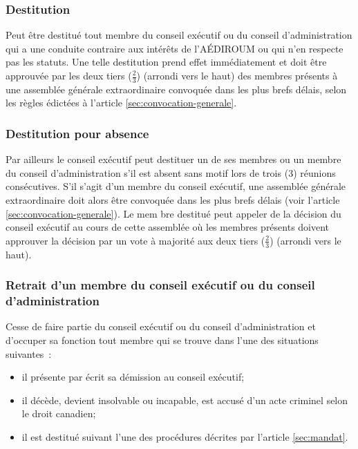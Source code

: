 \documentclass{aediroum}
\newcommand{\article}[1]{article \ref{#1}}
\begin{document}
\subsubsection{Destitution}\label{sec:destitution}

Peut être destitué tout membre du conseil exécutif ou du conseil d'administration qui a une conduite contraire aux intérêts de l'AÉDIROUM ou qui n'en respecte pas les statuts. Une telle destitution prend effet immédiatement et doit être approuvée par les deux tiers (\( \frac{2}{3} \)) (arrondi vers le haut) des membres présents à une assemblée générale extraordinaire convoquée dans les plus brefs délais, selon les règles édictées à l'\article{sec:convocation-generale}.

\subsubsection{Destitution pour absence}\label{sec:destitution-pour-absence}

Par ailleurs le conseil exécutif peut destituer un de ses membres ou un membre du conseil d'administration s'il est absent sans motif lors de trois (3) réunions consécutives. S'il s'agit d'un membre du conseil exécutif, une assemblée générale extraordinaire doit alors être convoquée dans les plus brefs délais (voir l'\article{sec:convocation-generale}). Le mem
bre destitué peut appeler de la décision du conseil exécutif au cours de cette assemblée où les membres présents doivent approuver la décision par un vote à majorité aux deux tiers (\( \frac{2}{3} \)) (arrondi vers le haut).

\subsubsection{Retrait d'un membre du conseil exécutif ou du conseil d'administration}\label{sec:retrait-dun-membre-exec-admin}

Cesse de faire partie du conseil exécutif ou du conseil d'administration et d'occuper sa fonction tout membre qui se trouve dans l'une des situations suivantes~:
  \begin{itemize}
  \item il présente par écrit sa démission au conseil exécutif;
  \item il décède, devient insolvable ou incapable, est accusé d'un acte criminel selon le droit canadien;
  \item il est destitué suivant l'une des procédures décrites par l'\article{sec:mandat}.
  \end{itemize}
\end{document}
